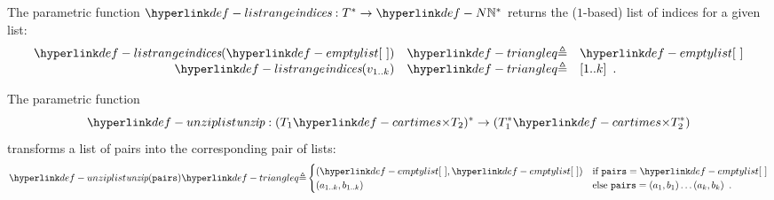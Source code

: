 \hypertarget{def-listrange}{}
\begin{definition}
The parametric function $\listrange : T^* \rightarrow \N^*$ returns the ($1$-based) list of indices for a given list:
\[
    \begin{array}{rcl}
        \listrange(\emptylist) &\triangleq& \emptylist\\
        \listrange(v_{1..k}) &\triangleq& [1..k] \enspace.
    \end{array}
\]
\end{definition}


\hypertarget{def-unziplist}{}
\begin{definition}
The parametric function
\[
\unziplist : (T_1 \cartimes T_2)^* \rightarrow (T_1^* \cartimes T_2^*)
\]
transforms a list of pairs into the corresponding pair of lists:
\[
  \unziplist(\pairs) \triangleq \begin{cases}
    (\emptylist, \emptylist)  & \text{if }\pairs = \emptylist\\
    (a_{1..k}, b_{1..k})      & \text{else }\pairs = (a_1,b_1) \ldots (a_k,b_k)  \enspace.
  \end{cases}
\]
\end{definition}

